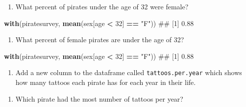 \documentclass[]{book}
\newenvironment{Shaded}{\begin{snugshade}}{\end{snugshade}}
\newcommand{\KeywordTok}[1]{\textcolor[rgb]{0.13,0.29,0.53}{\textbf{#1}}}
\newcommand{\DecValTok}[1]{\textcolor[rgb]{0.00,0.00,0.81}{#1}}
\newcommand{\StringTok}[1]{\textcolor[rgb]{0.31,0.60,0.02}{#1}}
\newcommand{\OperatorTok}[1]{\textcolor[rgb]{0.81,0.36,0.00}{\textbf{#1}}}
\newcommand{\NormalTok}[1]{#1}
\providecommand{\tightlist}{%
  \setlength{\itemsep}{0pt}\setlength{\parskip}{0pt}}
\theoremstyle{definition}
\theoremstyle{definition}
\theoremstyle{remark}
\begin{document}
\begin{enumerate}
\def\labelenumi{\arabic{enumi}.}
\setcounter{enumi}{4}
\tightlist
\item
  What percent of pirates under the age of 32 were female?
\end{enumerate}

\begin{Shaded}
\begin{Highlighting}[]
\KeywordTok{with}\NormalTok{(piratesurvey, }
     \KeywordTok{mean}\NormalTok{(sex[age }\OperatorTok{<}\StringTok{ }\DecValTok{32}\NormalTok{] }\OperatorTok{==}\StringTok{ "F"}\NormalTok{))}
\NormalTok{## [1] 0.88}
\end{Highlighting}
\end{Shaded}

\begin{enumerate}
\def\labelenumi{\arabic{enumi}.}
\setcounter{enumi}{5}
\tightlist
\item
  What percent of female pirates are under the age of 32?
\end{enumerate}

\begin{Shaded}
\begin{Highlighting}[]
\KeywordTok{with}\NormalTok{(piratesurvey, }
     \KeywordTok{mean}\NormalTok{(sex[age }\OperatorTok{<}\StringTok{ }\DecValTok{32}\NormalTok{] }\OperatorTok{==}\StringTok{ "F"}\NormalTok{))}
\NormalTok{## [1] 0.88}
\end{Highlighting}
\end{Shaded}

\begin{enumerate}
\def\labelenumi{\arabic{enumi}.}
\setcounter{enumi}{6}
\tightlist
\item
  Add a new column to the dataframe called \texttt{tattoos.per.year}
  which shows how many tattoos each pirate has for each year in their
  life.
\end{enumerate}

\begin{Shaded}
\end{Shaded}

\begin{enumerate}
\def\labelenumi{\arabic{enumi}.}
\setcounter{enumi}{7}
\tightlist
\item
  Which pirate had the most number of tattoos per year?
\end{enumerate}
\end{document}
